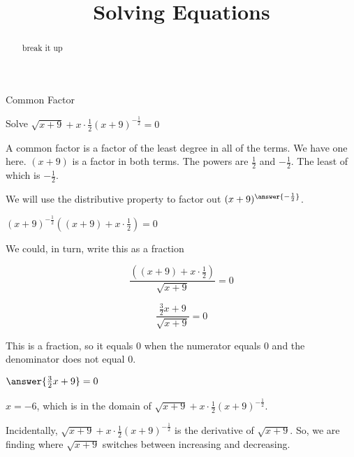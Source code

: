 \documentclass{ximera}
\title{Solving Equations}
\begin{document}
\begin{abstract}
break it up
\end{abstract}
\maketitle





\begin{example}  Common Factor


Solve $\sqrt{x+9} + x \cdot \frac{1}{2} (x+9)^{-\tfrac{1}{2}} = 0$



\begin{explanation}



A common factor is a factor of the least degree in all of the terms.  We have one here. $(x+9)$ is a factor in both terms.  The powers are $\frac{1}{2}$ and $-\frac{1}{2}$. The least of which is $-\frac{1}{2}$.

We will use the distributive property to factor out $(x+9)^{\answer{-\frac{1}{2}}}$.


$(x+9)^{-\tfrac{1}{2}} \left((x+9) + x \cdot \frac{1}{2}\right)  = 0$


We could, in turn, write this as a fraction


\[  \frac{\left((x+9) + x \cdot \frac{1}{2}\right)}{\sqrt{x+9}} = 0 \]


\[  \frac{ \frac{3}{2} x + 9}{\sqrt{x+9}} = 0 \]



This is a fraction, so it equals $0$ when the numerator equals $0$ and the denominator does not equal $0$.


$\answer{\frac{3}{2} x + 9} = 0$



$x = -6$, which is in the domain of $\sqrt{x+9} + x \cdot \frac{1}{2} (x+9)^{-\tfrac{1}{2}}$.


\end{explanation}
\end{example}




Incidentally, $\sqrt{x+9} + x \cdot \frac{1}{2} (x+9)^{-\tfrac{1}{2}}$ is the derivative of $\sqrt{x+9}$.  So, we are finding where $\sqrt{x+9}$ switches between increasing and decreasing.
\end{document}
